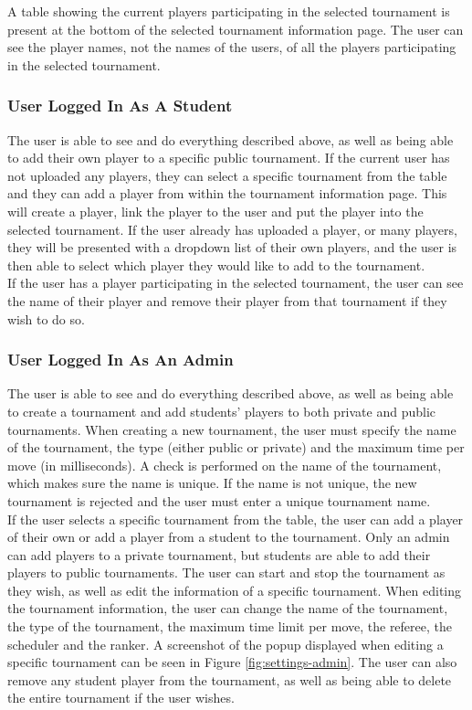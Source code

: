 \documentclass[a4paper, 11pt]{report}
\begin{document}
A table showing the current players participating in the selected tournament is
present at the bottom of the selected tournament information page. The user can
see the player names, not the names of the users, of all the players participating
in the selected tournament.

\subsubsection*{User Logged In As A Student}

The user is able to see and do everything described above, as well as being able
to add their own player to a specific public tournament. If the current user has not
uploaded any players, they can select a specific tournament from the table and
they can add a player from within the tournament information page. This will create
a player, link the player to the user and put the player into the selected
tournament. If the user already has uploaded a player, or many players, they will
be presented with a dropdown list of their own players, and the user is then able
to select which player they would like to add to the tournament. \\

If the user has a player participating in the selected tournament, the user can
see the name of their player and remove their player from that tournament if
they wish to do so.

\subsubsection*{User Logged In As An Admin}

The user is able to see and do everything described above, as well as being able
to create a tournament and add students' players to both private and public
tournaments. When creating a new tournament, the user must specify the name of
the tournament, the type (either public or private) and the maximum time per move
(in milliseconds). A check is performed on the name of the tournament, which makes
sure the name is unique. If the name is not unique, the new tournament is rejected
and the user must enter a unique tournament name. \\

If the user selects a specific tournament from the table, the user can add a player
of their own or add a player from a student to the tournament. Only an admin can
add players to a private tournament, but students are able to add their players
to public tournaments. The user can start and stop the tournament as they wish,
as well as edit the information of a specific tournament. When editing the
tournament information, the user can change the name of the tournament, the type
of the tournament, the maximum time limit per move, the referee, the scheduler
and the ranker. A screenshot of the popup displayed when editing a specific
tournament can be seen in Figure \ref{fig:settings-admin}. The user can also
remove any student player from the tournament, as well as being able to delete
the entire tournament if the user wishes.
\end{document}
